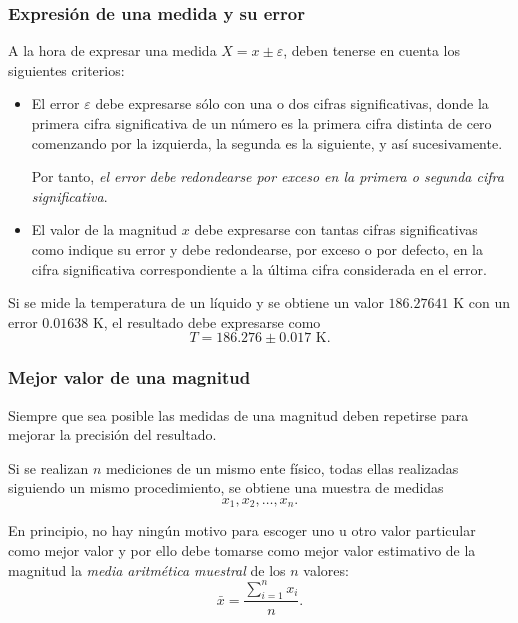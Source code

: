 \begin{frame}
\frametitle{Expresión de una medida y su error}
A la hora de expresar una medida $X=x\pm \varepsilon$, deben tenerse en cuenta los siguientes criterios:
\begin{itemize}
\item El error $\varepsilon$ debe expresarse sólo con una o dos cifras significativas, donde la primera cifra
significativa de un número es la primera cifra distinta de cero comenzando por la izquierda, la segunda es la
siguiente, y así sucesivamente.

Por tanto, \emph{el error debe redondearse por exceso en la primera o segunda cifra significativa}. 

\item El valor de la magnitud $x$ debe expresarse con tantas cifras significativas como indique su error y debe
redondearse, por exceso o por defecto, en la cifra significativa correspondiente a la última cifra considerada en el
error. 
\end{itemize}

 Si se mide la temperatura de un líquido y se obtiene un valor $186.27641$ K con un error
$0.01638$ K, el resultado debe expresarse como
\[
T=186.276\pm 0.017 \mbox{ K}.
\]
\end{frame}


\begin{frame}
\frametitle{Mejor valor de una magnitud}
Siempre que sea posible las medidas de una magnitud deben repetirse para mejorar la precisión del resultado.

Si se realizan $n$ mediciones de un mismo ente físico, todas ellas realizadas siguiendo un mismo procedimiento, se
obtiene una muestra de medidas 
\[
x_1,x_2,\ldots, x_n.
\]

En principio, no hay ningún motivo para escoger uno u otro valor particular como mejor valor y por ello debe tomarse
como mejor valor estimativo de la magnitud la \emph{media aritmética muestral} de los $n$ valores:
\[
\bar x = \frac{\sum_{i=1}^n x_i}{n}.
\] 
\end{frame}



